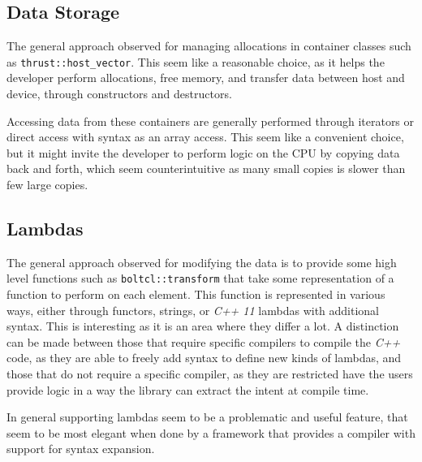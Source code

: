 \subsection{Data Storage}
The general approach observed for managing allocations in container classes such as \texttt{thrust::host\_vector}. This seem like a reasonable choice, as it helps the developer perform allocations, free memory, and transfer data between host and device, through constructors and destructors.

Accessing data from these containers are generally performed through iterators or direct access with syntax as an array access. This seem like a convenient choice, but it might invite the developer to perform logic on the CPU by copying data back and forth, which seem counterintuitive as many small copies is slower than few large copies.

\subsection{Lambdas}
The general approach observed for modifying the data is to provide some high level functions such as \texttt{boltcl::transform} that take some representation of a function to perform on each element. This function is represented in various ways, either through functors, strings, or \textit{C++ 11} lambdas with additional syntax. This is interesting as it is an area where they differ a lot. A distinction can be made between those that require specific compilers to compile the \textit{C++} code, as they are able to freely add syntax to define new kinds of lambdas, and those that do not require a specific compiler, as they are restricted have the users provide logic in a way the library can extract the intent at compile time.

In general supporting lambdas seem to be a problematic and useful feature, that seem to be most elegant when done by a framework that provides a compiler with support for syntax expansion.